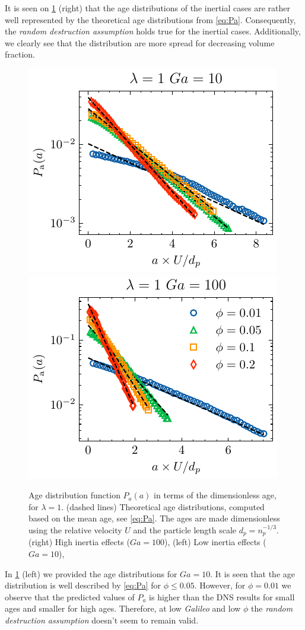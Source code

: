 It is seen on \ref{fig:age_picture} (right) that the age distributions of the inertial cases are rather well represented by the theoretical age distributions from \ref{eq:Pa}.
Consequently, the \textit{random destruction assumption} holds true for the inertial cases. 
Additionally, we clearly see that the distribution are more spread for decreasing volume fraction. 
\begin{figure}[h!]
    \centering
    \includegraphics[height = 0.3\textwidth]{image/HOMOGENEOUS_NEW/Dist/Pa_l_1_Ga_10.pdf}
    \includegraphics[height = 0.3\textwidth]{image/HOMOGENEOUS_NEW/Dist/Pa_l_1_Ga_100.pdf}
    \caption{
    Age distribution function $P_a(a)$ in terms of the dimensionless age, for $\lambda = 1$.
    (dashed lines) Theoretical age distributions, computed based on the mean age, see \ref{eq:Pa}. 
    The ages are made dimensionless using the relative velocity $U$ and the particle length scale $d_p = n_p^{-1/3}$.  
    (right) High inertia effects ($Ga = 100$),
    (left) Low inertia effects ($Ga = 10$),
    }
    \label{fig:age_picture}
\end{figure}
In \ref{fig:age_picture} (left)  we provided the age distributions for $Ga = 10$. 
It is seen that the age distribution is well described by \ref{eq:Pa} for $\phi \le 0.05$.
However, for $\phi = 0.01$ we observe that the predicted values of $P_a$ is higher than the DNS results for small ages and smaller for high ages. 
Therefore, at low \textit{Galileo} and low $\phi$ the \textit{random destruction assumption} doesn't seem to remain valid. 
